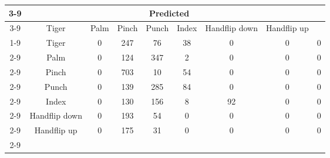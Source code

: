 \documentclass{standalone}
\begin{document}
 
 \begin{tabular}{|c |c |c |c |c |c |c |c |c |}
\cline{3-9}\multicolumn{2}{c|}{} & \multicolumn{7}{c|}{Predicted} \\ 
\cline{3-9} \multicolumn{2}{c |}{ } & Tiger & Palm & Pinch & Punch & Index & Handflip down & Handflip up\\ 
\cline{1-9}\multirow{7}{*}{\rotatebox[origin=c]{90}{Actual}} & Tiger & 0 & 247 & 76 & 38 & 0 & 0 & 0\\ 
 \cline{2-9} & Palm & 0 & 124 & 347 & 2 & 0 & 0 & 0\\ 
 \cline{2-9} & Pinch & 0 & 703 & 10 & 54 & 0 & 0 & 0\\ 
 \cline{2-9} & Punch & 0 & 139 & 285 & 84 & 0 & 0 & 0\\ 
 \cline{2-9} & Index & 0 & 130 & 156 & 8 & 92 & 0 & 0\\ 
 \cline{2-9} & Handflip down & 0 & 193 & 54 & 0 & 0 & 0 & 0\\ 
 \cline{2-9} & Handflip up & 0 & 175 & 31 & 0 & 0 & 0 & 0\\ 
 \cline{2-9}\hline \end{tabular}
 
\end{document}
